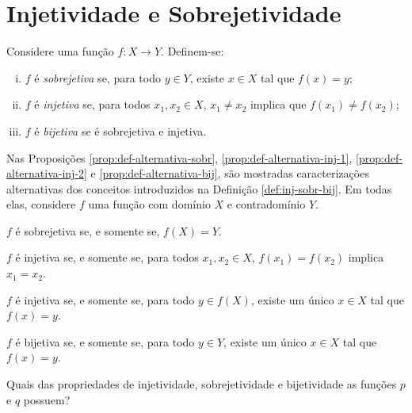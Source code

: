 \section{Injetividade e Sobrejetividade}

\begin{definition}
\label{def:inj-sobr-bij}
    Considere uma função $f: X \to Y$. Definem-se:
    \begin{enumerate}[(i)]
    \item $f$ é \emph{sobrejetiva} se, para todo $y \in Y$, existe $x
    \in X$ tal que $f(x) = y$;
    \item $f$ é \emph{injetiva} se, para todos $x_1, x_2 \in X$, $x_1 \ne x_2$ implica que $f(x_1) \ne f(x_2)$;
    \item $f$ é \emph{bijetiva} se é sobrejetiva e injetiva.
    \end{enumerate}
\end{definition}

Nas Proposições \ref{prop:def-alternativa-sobr}, \ref{prop:def-alternativa-inj-1}, \ref{prop:def-alternativa-inj-2} e \ref{prop:def-alternativa-bij}, são mostradas caracterizações alternativas dos conceitos introduzidos na Definição \ref{def:inj-sobr-bij}.
Em todas elas, considere $f$ uma função com domínio $X$ e contradomínio $Y$.
%
\begin{proposition}
\label{prop:def-alternativa-sobr}
    $f$ é sobrejetiva se, e somente se, $f(X) = Y$.
\end{proposition}

\begin{proposition}
\label{prop:def-alternativa-inj-1}
    $f$ é injetiva se, e somente se, para todos $x_1, x_2 \in X$, $f(x_1) = f(x_2)$ implica $x_1 = x_2$.
\end{proposition}

\begin{proposition}
\label{prop:def-alternativa-inj-2}
    $f$ é injetiva se, e somente se, para todo $y \in f(X)$, existe um único $x \in X$ tal que $f(x) = y$.
\end{proposition}

\begin{proposition}
\label{prop:def-alternativa-bij}
    $f$ é bijetiva se, e somente se, para todo $y \in Y$, existe um único $x \in X$ tal que $f(x) = y$.
\end{proposition}

\begin{example}
\label{ex:p-q-inj-sobr-bij}
    Quais das propriedades de injetividade, sobrejetividade e bijetividade as funções $p$ e $q$ possuem?
\end{example}

